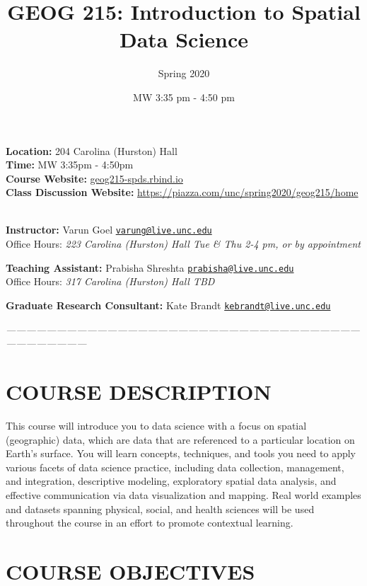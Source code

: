 \documentclass[11pt,]{article}
\title{GEOG 215: Introduction to Spatial Data Science}
\author{Spring 2020}
\date{MW 3:35 pm - 4:50 pm}
\begin{document}
\maketitle

\textbf{Location:} 204 Carolina (Hurston) Hall\\
\textbf{Time:} MW 3:35pm - 4:50pm\\
\textbf{Course Website:} \url{geog215-spds.rbind.io}\\
\textbf{Class Discussion Website:}
\url{https://piazza.com/unc/spring2020/geog215/home} ~ ~

\textbf{Instructor:} Varun Goel \textbar{}
\href{mailto:varung@live.unc.edu}{\nolinkurl{varung@live.unc.edu}}\\
Office Hours: \emph{223 Carolina (Hurston) Hall \textbar{} Tue \& Thu
2-4 pm, or by appointment}

\textbf{Teaching Assistant:} Prabisha Shreshta \textbar{}
\href{mailto:prabisha@live.unc.edu}{\nolinkurl{prabisha@live.unc.edu}}\\
Office Hours: \emph{317 Carolina (Hurston) Hall \textbar{} TBD}

\textbf{Graduate Research Consultant:} Kate Brandt \textbar{}
\href{mailto:kebrandt@live.unc.edu}{\nolinkurl{kebrandt@live.unc.edu}}

\emph{---------------------------------------------------------------------------------------------------------------------------------}

\hypertarget{course-description}{%
\section{COURSE DESCRIPTION}\label{course-description}}

This course will introduce you to data science with a focus on spatial
(geographic) data, which are data that are referenced to a particular
location on Earth's surface. You will learn concepts, techniques, and
tools you need to apply various facets of data science practice,
including data collection, management, and integration, descriptive
modeling, exploratory spatial data analysis, and effective communication
via data visualization and mapping. Real world examples and datasets
spanning physical, social, and health sciences will be used throughout
the course in an effort to promote contextual learning.

\hypertarget{course-objectives}{%
\section{COURSE OBJECTIVES}\label{course-objectives}}
\end{document}
